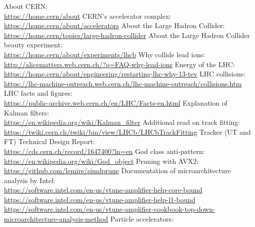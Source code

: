 \documentclass[12pt]{article}
\begin{document}
\begin{thebibliography}{asd}
	 About CERN: \\
		\url{https://home.cern/about}
	 CERN's accelerator complex: \\
		\url{https://home.cern/about/accelerators}
	 About the Large Hadron Collider: \\
		\url{https://home.cern/topics/large-hadron-collider}
	 About the Large Hadron Collider beauty experiment: \\
		\url{https://home.cern/about/experiments/lhcb}
	 Why collide lead ions: \\
		\url{http://alicematters.web.cern.ch/?q=FAQ-why-lead-ions}
	 Energy of the LHC: \\
		\url{https://home.cern/about/engineering/restarting-lhc-why-13-tev}
	 LHC collisions: \\
		\url{https://lhc-machine-outreach.web.cern.ch/lhc-machine-outreach/collisions.htm}
	 LHC facts and figures: \\
		\url{https://public-archive.web.cern.ch/en/LHC/Facts-en.html}
	 Explanation of Kalman filters: \\
		\url{https://en.wikipedia.org/wiki/Kalman_filter}
	 Additional read on track fitting: \\
		\url{https://twiki.cern.ch/twiki/bin/view/LHCb/LHCbTrackFitting}
	 Tracker (UT and FT) Technical Design Report: \\
		\url{https://cds.cern.ch/record/1647400?ln=en}
	 God class anti-pattern: \\
		\url{https://en.wikipedia.org/wiki/God_object}
	 Pruning with AVX2: \\
		\url{https://github.com/lemire/simdprune}
	 Documentation of microarchitecture analysis by Intel: \\
		\url{https://software.intel.com/en-us/vtune-amplifier-help-core-bound}\\
		\url{https://software.intel.com/en-us/vtune-amplifier-help-l1-bound}\\
		\url{https://software.intel.com/en-us/vtune-amplifier-cookbook-top-down-microarchitecture-analysis-method}
	 Particle accelerators:\\

\end{thebibliography}
\end{document}
